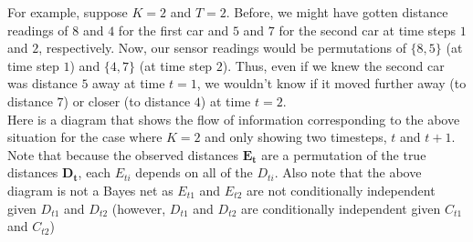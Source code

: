 \documentclass{article}
\theoremstyle{case}
\theoremstyle{definition}
\begin{document}
For example, suppose $K=2$ and $T = 2$.
Before, we might have gotten distance readings of $8$ and $4$ for the first car and
$5$ and $7$ for the second car at time steps $1$ and $2$, respectively.
Now, our sensor readings would be permutations of $\{8, 5\}$ (at time step $1$) and $\{4, 7\}$ (at time step $2$).
Thus, even if we knew the second car was distance $5$ away at time $t = 1$,
we wouldn't know if it moved further away (to distance $7$) or closer (to distance $4$) at time $t = 2$.\\

Here is a diagram that shows the flow of information corresponding to the above situation for the case where $K = 2$ and only showing two timesteps, $t$ and $t+1$. Note that because the observed distances $\mathbf{E_t}$ are a permutation of the true distances $\mathbf{D_t}$, each $E_{ti}$ depends on all of the $D_{ti}$. Also note that the above diagram is not a Bayes net as $E_{t1}$ and $E_{t2}$ are not conditionally independent given $D_{t1}$ and $D_{t2}$ (however, $D_{t1}$ and $D_{t2}$ are conditionally independent given $C_{t1}$ and $C_{t2}$)
\end{document}
